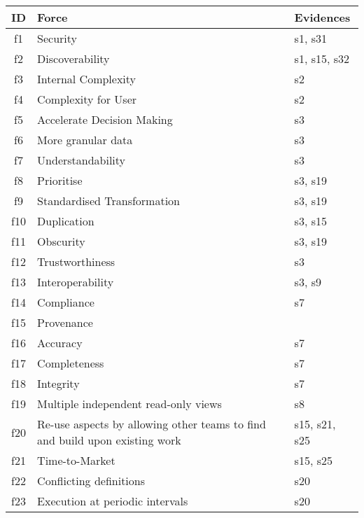 \begin{tabular}{|c|p{}|p{}|}
\hline
{\bf ID} & {\bf Force} & {\bf Evidences}\\
\hline
f1 & Security & \cellcolor{emerald_shape_1} {s1, s31}\\
f2 & Discoverability & \cellcolor{emerald_shape_2} {s1, s15, s32}\\
f3 & Internal Complexity & \cellcolor{emerald_shape_1} {s2}\\
f4 & Complexity for User & \cellcolor{emerald_shape_1} {s2}\\
f5 & Accelerate Decision Making & \cellcolor{emerald_shape_1} {s3}\\
f6 & More granular data & \cellcolor{emerald_shape_1} {s3}\\
f7 & Understandability & \cellcolor{emerald_shape_1} {s3}\\
f8 & Prioritise & \cellcolor{emerald_shape_1} {s3, s19}\\
f9 & Standardised Transformation & \cellcolor{emerald_shape_1} {s3, s19}\\
f10 & Duplication & \cellcolor{emerald_shape_1} {s3, s15}\\
f11 & Obscurity & \cellcolor{emerald_shape_1} {s3, s19}\\
f12 & Trustworthiness & \cellcolor{emerald_shape_1} {s3}\\
f13 & Interoperability & \cellcolor{emerald_shape_1} {s3, s9}\\
f14 & Compliance & \cellcolor{emerald_shape_1} {s7}\\
f15 & Provenance & \cellcolor{emerald_shape_1} {}\\
f16 & Accuracy & \cellcolor{emerald_shape_1} {s7}\\
f17 & Completeness & \cellcolor{emerald_shape_1} {s7}\\
f18 & Integrity & \cellcolor{emerald_shape_1} {s7}\\
f19 & Multiple independent read-only views & \cellcolor{emerald_shape_1} {s8}\\
f20 & Re-use aspects by allowing other teams to find and build upon existing work & \cellcolor{emerald_shape_2} {s15, s21, s25}\\
f21 & Time-to-Market & \cellcolor{emerald_shape_1} {s15, s25}\\
f22 & Conflicting definitions & \cellcolor{emerald_shape_1} {s20}\\
f23 & Execution at periodic intervals & \cellcolor{emerald_shape_1} {s20}\\

\end{tabular}
